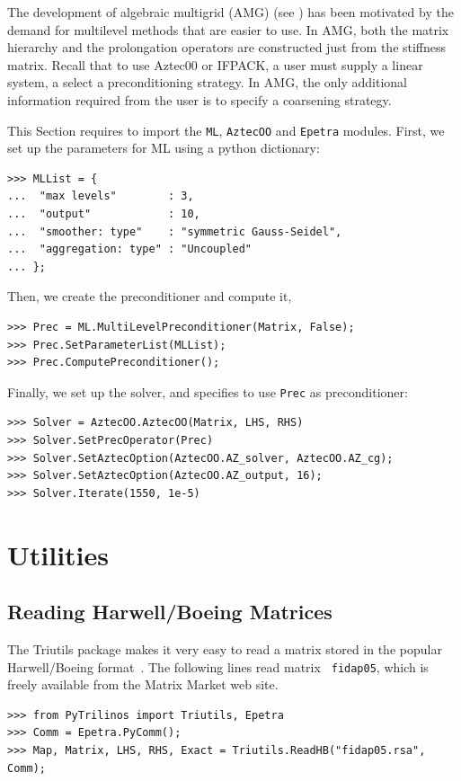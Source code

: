 \documentclass[10pt,relax]{SANDreport}
\begin{document}
The development of algebraic multigrid (AMG)  (see \cite[Section 8]{Briggs}) 
has been motivated by the demand for multilevel methods that are
easier to use.  In AMG, both the matrix hierarchy and the prolongation
operators are constructed just from the stiffness matrix.  Recall that to use
Aztec00 or IFPACK,  a user must supply a linear system, a select a
preconditioning strategy.  In AMG, the only additional information required
from the user is to specify a coarsening strategy.

This Section requires to import the {\tt ML}, {\tt AztecOO} and {\tt Epetra}
modules. First, we set up the parameters for ML using a python dictionary:
\begin{verbatim}
>>> MLList = {
...  "max levels"        : 3,
...  "output"            : 10,
...  "smoother: type"    : "symmetric Gauss-Seidel",
...  "aggregation: type" : "Uncoupled"
... };
\end{verbatim}
Then, we create the preconditioner and compute it,
\begin{verbatim}
>>> Prec = ML.MultiLevelPreconditioner(Matrix, False);
>>> Prec.SetParameterList(MLList);
>>> Prec.ComputePreconditioner();
\end{verbatim}
Finally, we set up the solver, and specifies to use \verb!Prec! as
preconditioner:
\begin{verbatim}
>>> Solver = AztecOO.AztecOO(Matrix, LHS, RHS)
>>> Solver.SetPrecOperator(Prec)
>>> Solver.SetAztecOption(AztecOO.AZ_solver, AztecOO.AZ_cg);
>>> Solver.SetAztecOption(AztecOO.AZ_output, 16);
>>> Solver.Iterate(1550, 1e-5)
\end{verbatim}

\section{Utilities}
\label{sec:utilities}

\subsection{Reading Harwell/Boeing Matrices}
\label{sec:hb}

The Triutils package makes it very easy to read a matrix stored in the popular
Harwell/Boeing format~\cite{hb}. The following lines read matrix {\tt
  fidap05}, which is freely available from the Matrix Market web site.
\begin{verbatim}
>>> from PyTrilinos import Triutils, Epetra
>>> Comm = Epetra.PyComm();
>>> Map, Matrix, LHS, RHS, Exact = Triutils.ReadHB("fidap05.rsa", Comm);
\end{verbatim}
\end{document}
